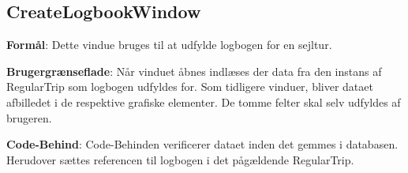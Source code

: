 \subsection{CreateLogbookWindow}

\textbf{Formål}: 
Dette vindue bruges til at udfylde logbogen for en sejltur.

\textbf{Brugergrænseflade}:  
Når vinduet åbnes indlæses der data fra den instans af RegularTrip som logbogen udfyldes for.
Som tidligere vinduer, bliver dataet afbilledet i de respektive grafiske elementer. 
De tomme felter skal selv udfyldes af brugeren. 

\textbf{Code-Behind}: 
Code-Behinden verificerer dataet inden det gemmes i databasen.
Herudover sættes referencen til logbogen i det pågældende RegularTrip.

